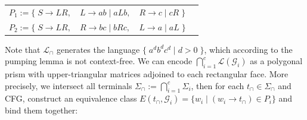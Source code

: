 \documentclass[sigplan,review,anonymous,acmsmall]{acmart}\settopmatter{printfolios=false,printccs=false,printacmref=false}
\begin{document}
\begin{table}[H]
\begin{tabular}{llll}
  $P_1 := \big\{\;S \rightarrow L R,$ & $L \rightarrow a b \mid a L b,$ & $R \rightarrow c \mid c R\;\big\}$\vspace{5pt}\\
  $P_2 := \big\{\;S \rightarrow L R,$ & $R \rightarrow b c \mid b R c,$ & $L \rightarrow a \mid a L\;\big\}$
\end{tabular}
\end{table}

\noindent Note that $\mathcal{L}_\cap$ generates the language $\big\{\;a^d b^d c^d \mid d > 0\;\big\}$, which according to the pumping lemma is not context-free. We can encode $\bigcap_{i=1}^c \mathcal{L}(\mathcal{G}_i)$ as a polygonal prism with upper-triangular matrices adjoined to each rectangular face. More precisely, we intersect all terminals $\Sigma_\cap := \bigcap_{i=1}^c \Sigma_i$, then for each $t_\cap \in \Sigma_\cap$ and CFG, construct an equivalence class $E(t_\cap, \mathcal{G}_i) = \{ w_i \mid (w_i \rightarrow t_\cap) \in P_i\}$ and bind them together:\vspace{-5pt}
\end{document}
